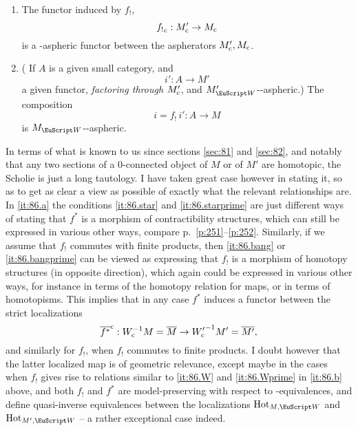 \begin{scholie}
\begin{enumerate}[label=\alph*),font=\normalfont]
\begin{enumerate}[label=(\roman*),font=\normalfont]
    \item\label{it:86.d.iv}
      The functor induced by $f_!$\kern1pt,
      \[{f_!}_{\mathrm{c}} : M'_{\mathrm{c}} \to M_{\mathrm{c}}\]
      is a \scrW-aspheric functor between the aspherators $M'_{\mathrm{c}},M_{\mathrm{c}}$.
    \item\label{it:86.d.v}
      \textup(\kern1pt If $A$ is a given small category, and
      \[i':A\to M'\]
      a given functor, \emph{factoring through $M'_{\mathrm{c}}$}, and
      $M'_\scrW$-\scrW-aspheric.\textup) The composition
      \[i = f_!\,i' : A\to M\]
      is $M_\scrW$-\scrW-aspheric.
    \end{enumerate}
  \end{enumerate}
\end{scholie}
\begin{comments}
  In terms of what is known to us since sections \ref{sec:81} and
  \ref{sec:82}, and notably that any two sections of a $0$-connected
  object of $M$ or of $M'$ are homotopic, the Scholie is just a long
  tautology. I have taken great case however in stating it, so as to
  get as clear a view as possible of exactly what the relevant
  relationships are. In \ref{it:86.a} the conditions \ref{it:86.star}
  and \ref{it:86.starprime} are just different ways of stating that
  $f^*$ is a morphism of contractibility structures, which can still
  be expressed in various other ways, compare p.\
  \ref{p:251}--\ref{p:252}. Similarly, if we assume that $f_!$
  commutes with finite products, then \ref{it:86.bang} or
  \ref{it:86.bangprime} can be viewed as expressing that $f_!$ is a
  morphism of homotopy structures (in opposite direction), which again
  could be expressed in various other ways, for instance in terms of
  the homotopy relation for maps, or in terms of homotopisms. This
  implies that in any case $f^*$ induces a functor between the strict
  localizations
  \[\overline{f^*}^{\mathrm c} : W_{\mathrm{c}}^{-1}M=\overline M \to
  {W'_{\mathrm{c}}}^{-1}M' = \overline{M'},\]
  and similarly for $f_!$, when $f_!$ commutes to finite products. I
  doubt however that the latter localized map is of geometric
  relevance, except maybe in the cases when $f_!$ gives rise to
  relations similar to \ref{it:86.W} and \ref{it:86.Wprime} in
  \ref{it:86.b} above, and both $f_!$ and $f^*$ are model-preserving
  with respect to \scrW-equivalences, and define quasi-inverse
  equivalences between the localizations $\HotOf_{M,\scrW}$ and
  $\HotOf_{M',\scrW}$ -- a rather exceptional case indeed.
\end{comments}

